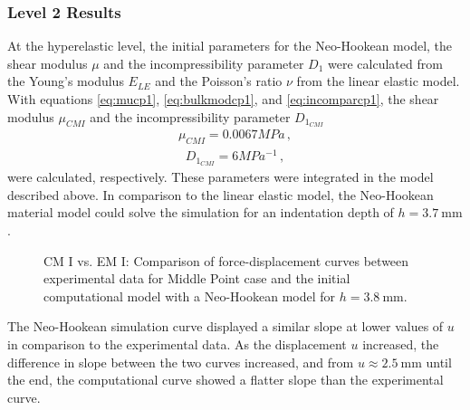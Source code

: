 \subsubsection*{Level 2 Results}
\label{subsection:level2cmI}
At the hyperelastic level, the initial parameters for the Neo-Hookean model, 
the shear modulus $\mu$ and the incompressibility parameter $D_1$ were calculated from the Young's modulus $E_{LE}$
and the Poisson's ratio $\nu$ from the linear elastic model. With equations \ref{eq:mucp1}, \ref{eq:bulkmodcp1}, 
and \ref{eq:incomparcp1}, the shear modulus $\mu_{CMI}$ and the incompressibility parameter $D_{1_{CMI}}$
\begin{align}
    \mu_{CMI} = 0.0067 MPa \, ,
    \label{eq:mucp1result}
\end{align}
\begin{align}
    D_{1_{CMI}} = 6 MPa^{-1} \, ,
    \label{eq:d1cp1result}
\end{align}
were calculated, respectively. These parameters were integrated in the model described above. In comparison to 
the linear elastic model, the Neo-Hookean material model could solve the simulation for an indentation depth of 
$h =  \SI{3.7}{\milli \meter}$.
\begin{figure}%
    \centering
   \quad
   \caption[Computational model I vs. Experimental data - Neo-Hookean]{CM I vs. EM I: Comparison of force-displacement curves between experimental data for Middle Point case and the initial computational model with a Neo-Hookean model for $h = \SI{3.8}{\milli \meter}$.}%
   \label{fig:MPIvsCPINH}%
\end{figure}
The Neo-Hookean simulation curve displayed a similar slope at lower values of $u$ in comparison to the experimental data.
As the displacement $u$ increased, the difference in slope between the two curves increased, and from $u \approx \SI{2.5}{\milli \meter}$
until the end, the computational curve showed a flatter slope than the experimental curve.\\

